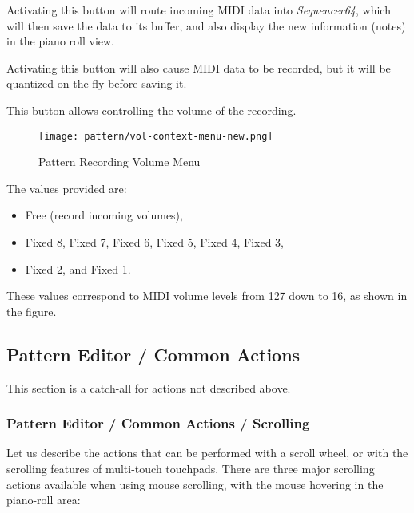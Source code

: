    Activating this button will route incoming MIDI data into
   \textsl{Sequencer64}, which will then save the data to its buffer, and also
   display the new information (notes) in the piano roll view.

   Activating this button will also cause MIDI data to be recorded, but it
   will be quantized on the fly before saving it.

   This button allows controlling the volume of the recording.

\begin{figure}[H]
   \centering 
   \texttt{[image: pattern/vol-context-menu-new.png]}
   \caption{Pattern Recording Volume Menu}
   \label{fig:pattern_edit_recording_volume_menu}
\end{figure}

   The values provided are:

   \begin{itemize}
      \item Free (record incoming volumes),
      \item Fixed 8, Fixed 7, Fixed 6, Fixed 5, Fixed 4, Fixed 3,
      \item Fixed 2, and Fixed 1.
   \end{itemize}

   These values correspond to MIDI volume levels from 127 down to 16, as
   shown in the figure.

\subsection{Pattern Editor / Common Actions}
\label{subsec:seq64_pattern_editor_common}

   This section is a catch-all for actions not described above.

\subsubsection{Pattern Editor / Common Actions / Scrolling}
\label{subsec:seq64_pattern_editor_scrolling}

   Let us describe the actions that can be performed with a
   scroll wheel, or with the scrolling features of multi-touch touchpads.
   There are three major scrolling actions available when using mouse
   scrolling, with the mouse hovering in the piano-roll area:


